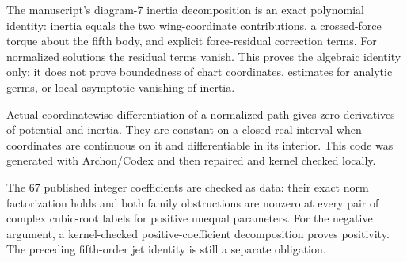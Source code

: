\begin{lemma}
\label{bp:d7-inertia}
\leanok
The manuscript's diagram-7 inertia decomposition is an exact polynomial
identity: inertia equals the two wing-coordinate contributions, a crossed-force
torque about the fifth body, and explicit force-residual correction terms.
For normalized solutions the residual terms vanish. This proves the algebraic
identity only; it does not prove boundedness of chart coordinates, estimates
for analytic germs, or local asymptotic vanishing of inertia.
\end{lemma}

\begin{theorem}
\label{bp:analytic-energy}
\leanok
Actual coordinatewise differentiation of a normalized path gives zero derivatives
of potential and inertia. They are constant on a closed real interval when
coordinates are continuous on it and differentiable in its interior. This code
was generated with Archon/Codex and then repaired and kernel checked locally.
\end{theorem}

\begin{theorem}
\label{bp:p66-certificate}
\leanok
The 67 published integer coefficients are checked as data: their exact norm
factorization holds and both family obstructions are nonzero at every
pair of complex cubic-root labels for positive unequal parameters. For the
negative argument, a kernel-checked positive-coefficient decomposition proves
positivity. The preceding fifth-order jet identity is still a separate obligation.
\end{theorem}

